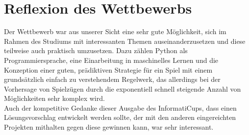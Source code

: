 \section{Reflexion des Wettbewerbs}
\label{sec:reflexion}

Der Wettbewerb war aus unserer Sicht eine sehr gute Möglichkeit, sich im Rahmen des Studiums mit interessanten Themen
auseinanderzusetzen und diese teilweise auch praktisch umzusetzen.
Dazu zählen \ua Python als Programmiersprache, eine Einarbeitung in maschinelles Lernen und die Konzeption einer
guten, prädiktiven Strategie für ein Spiel mit einem grundsätzlich einfach zu verstehendem Regelwerk, das allerdings
bei der Vorhersage von Spielzügen durch die exponentiell schnell steigende Anzahl von Möglichkeiten sehr komplex wird.
\\

Auch der kompetitive Gedanke dieser Ausgabe des InformatiCups, dass einen Lösungsvorschlag entwickelt werden sollte,
der mit den anderen eingereichten Projekten mithalten \bzw gegen diese gewinnen kann, war sehr interessant.
